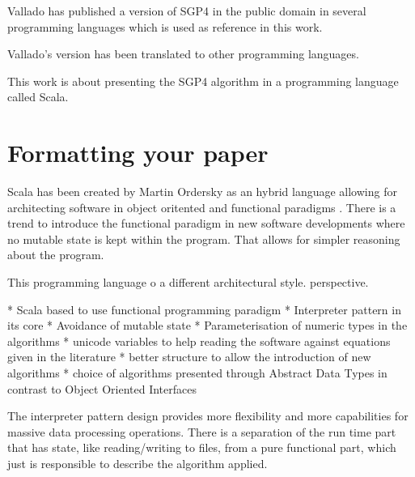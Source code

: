 \documentclass{article}
\begin{document}
Vallado has published a version of SGP4 in the public domain in several programming languages 
which is used as reference in this work. 

Vallado's version has been translated to other programming languages.

This work is about presenting the SGP4 algorithm in a programming language called Scala.


\section{Formatting your paper}
\label{sec:format}

Scala has been created by Martin Ordersky as an hybrid language allowing for architecting software in 
object oritented and functional paradigms \cite{scala-overview-tech-report}. There is a trend to introduce the functional paradigm in new software developments where no mutable state is kept within the program. That allows for simpler reasoning about the program.

This programming language o a different architectural style.
perspective.

* Scala based to use functional programming paradigm
* Interpreter pattern in its core
* Avoidance of mutable state
* Parameterisation of numeric types in the algorithms
* unicode variables to help reading the software against equations given in the literature
* better structure to allow the introduction of new algorithms 
* choice of algorithms presented through Abstract Data Types in contrast to Object Oriented Interfaces 

The interpreter pattern design provides more flexibility and more capabilities for massive data processing operations. There is a separation of the run time part that has state, like reading/writing to files, from a pure functional part, which just is responsible to describe the algorithm applied. 


\end{document}
